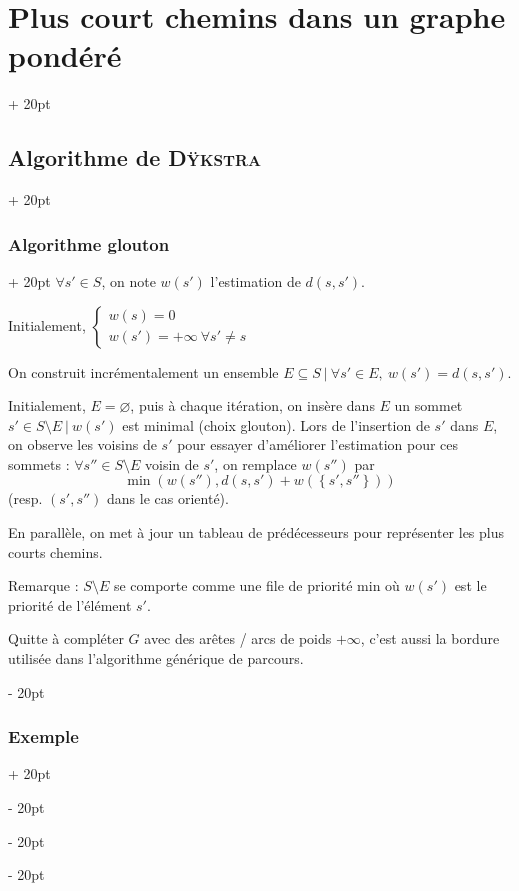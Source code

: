 \documentclass[a4paper, 12pt, twoside]{article}
\newcommand{\lr}[1]{\left( #1 \right)}
\newcommand{\set}[1]{\left\{ #1 \right\}}
\newcommand{\ind}[1][20pt]{\advance\leftskip + #1}
\newcommand{\deind}[1][20pt]{\advance\leftskip - #1}
\newenvironment{indt}[2][20pt]{#2 \par \ind[#1]}{\par \deind} %
\begin{document}
\begin{indt}{\section{Plus court chemins dans un graphe pondéré}}
\begin{indt}{\subsection{Algorithme de \textsc{Dÿkstra}}}
            \begin{indt}{\subsubsection{Algorithme glouton}}
                $\forall s' \in S$, on note $w(s')$ l'estimation de $d(s, s')$.

                Initialement,
                $
                    \begin{cases}
                        w(s) = 0
                        \\
                        w(s') = +\infty\ \forall s' \neq s
                    \end{cases}
                $

                On construit incrémentalement un ensemble $E \subseteq S\ |\ \forall s' \in E,\ w(s') = d(s, s')$.

                Initialement, $E = \varnothing$, puis à chaque itération, on insère dans $E$ un sommet $s' \in S \setminus E\ |\ w(s')$ est minimal (choix glouton).
                Lors de l'insertion de $s'$ dans $E$, on observe les voisins de $s'$ pour essayer d'améliorer l'estimation pour ces sommets :
                $\forall s'' \in S \setminus E$ voisin de $s'$, on remplace $w(s'')$ par
                \[
                    \min\!\lr{w(s''), d(s, s') + w(\set{s', s''})}
                \]
                (resp. $(s', s'')$ dans le cas orienté).

                En parallèle, on met à jour un tableau de prédécesseurs pour représenter les plus courts chemins.

                Remarque : $S \setminus E$ se comporte comme une file de priorité min où $w(s')$ est le priorité de l'élément $s'$.

                Quitte à compléter $G$ avec des arêtes / arcs de poids $+\infty$, c'est aussi la bordure utilisée dans l'algorithme générique de parcours.
            \end{indt}

            \vspace{12pt}
            
            \begin{indt}{\subsubsection{Exemple}}
                \begin{center}
\end{center}
\end{indt}
\end{indt}
\end{indt}
\end{document}
